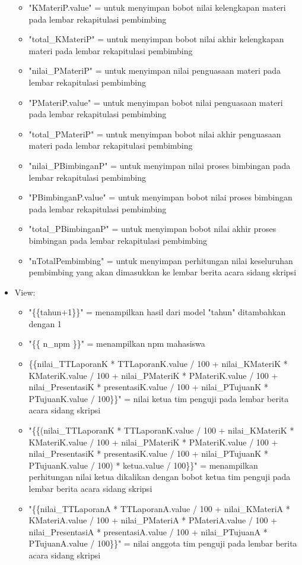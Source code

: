 \begin{itemize}
\begin{itemize}
			\item "KMateriP.value" = untuk menyimpan bobot nilai kelengkapan materi pada lembar rekapitulasi pembimbing
			\item "total\_KMateriP" = untuk menyimpan bobot nilai akhir kelengkapan materi pada lembar rekapitulasi pembimbing
			\item "nilai\_PMateriP" = untuk menyimpan nilai penguasaan materi pada lembar rekapitulasi pembimbing
			\item "PMateriP.value" = untuk menyimpan bobot nilai penguasaan materi pada lembar rekapitulasi pembimbing
			\item "total\_PMateriP" = untuk menyimpan bobot nilai akhir penguasaan materi pada lembar rekapitulasi pembimbing
			\item "nilai\_PBimbinganP" = untuk menyimpan nilai proses bimbingan pada lembar rekapitulasi pembimbing
			\item "PBimbinganP.value" = untuk menyimpan bobot nilai proses bimbingan pada lembar rekapitulasi pembimbing
			\item "total\_PBimbinganP" = untuk menyimpan bobot nilai akhir proses bimbingan pada lembar rekapitulasi pembimbing
			\item "nTotalPembimbing" = untuk menyimpan perhitungan nilai keseluruhan pembimbing yang akan dimasukkan ke lembar berita acara sidang skripsi
		\end{itemize}
		\item View:
		\begin{itemize}
			\item "\{\{tahun+1\}\}" = menampilkan hasil dari model "tahun" ditambahkan dengan 1
			\item "\{\{ n\_npm \}\}" = menampilkan npm mahasiswa
			\item \{\{nilai\_TTLaporanK * TTLaporanK.value / 100 + nilai\_KMateriK * KMateriK.value / 100 + nilai\_PMateriK * PMateriK.value / 100 + nilai\_PresentasiK * presentasiK.value / 100 + nilai\_PTujuanK * PTujuanK.value / 100\}\}" = nilai ketua tim penguji pada lembar berita acara sidang skripsi
			\item "\{\{(nilai\_TTLaporanK * TTLaporanK.value / 100 + nilai\_KMateriK * KMateriK.value / 100 + nilai\_PMateriK * PMateriK.value / 100 + nilai\_PresentasiK * presentasiK.value / 100 + nilai\_PTujuanK * PTujuanK.value / 100) * ketua.value / 100\}\}" = menampilkan perhitungan nilai ketua dikalikan dengan bobot ketua tim penguji pada lembar berita acara sidang skripsi
			\item "\{\{nilai\_TTLaporanA * TTLaporanA.value / 100 + nilai\_KMateriA * KMateriA.value / 100 + nilai\_PMateriA * PMateriA.value / 100 + nilai\_PresentasiA * presentasiA.value / 100 + nilai\_PTujuanA * PTujuanA.value / 100\}\}" = nilai anggota tim penguji pada lembar berita acara sidang skripsi

\end{itemize}
\end{itemize}

